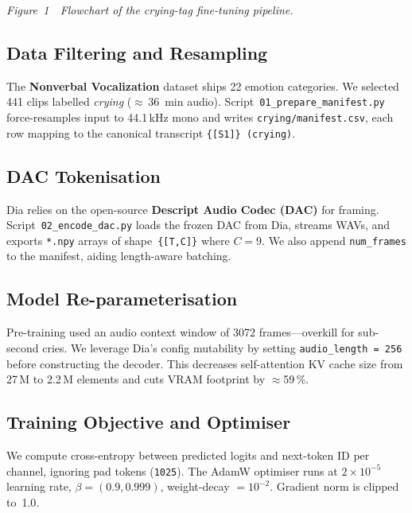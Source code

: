 \documentclass{article}
\begin{document}
\emph{Figure~1~~Flowchart of the crying-tag fine-tuning pipeline.}

\hypertarget{data-filtering-and-resampling}{%
\subsection{Data Filtering and
Resampling}\label{data-filtering-and-resampling}}

The \textbf{Nonverbal Vocalization} dataset ships 22 emotion categories.
We selected 441 clips labelled \emph{crying} ($\approx$\,36~min audio).
Script~\texttt{01\_prepare\_manifest.py} force-resamples input to
44.1\,kHz mono and writes \texttt{crying/manifest.csv}, each row mapping
to the canonical transcript \texttt{\{[S1]\}\,(crying)}.

\hypertarget{dac-tokenisation}{%
\subsection{DAC Tokenisation}\label{dac-tokenisation}}

Dia relies on the open-source \textbf{Descript Audio Codec (DAC)} for
framing. Script~\texttt{02\_encode\_dac.py} loads the frozen DAC from
Dia, streams WAVs, and exports \texttt{*.npy} arrays of
shape~\texttt{\{[T,C]\}} where \emph{$C=9$}. We also append
\texttt{num\_frames} to the manifest, aiding length-aware batching.

\hypertarget{model-reparameterisation}{%
\subsection{Model
Re-parameterisation}\label{model-reparameterisation}}

Pre-training used an audio context window of 3072 frames---overkill for
sub-second cries. We leverage Dia's config mutability by setting
\texttt{audio\_length = 256} before constructing the decoder. This
decreases self-attention KV cache size from 27\,M to 2.2\,M elements and
cuts VRAM footprint by $\approx$59\,\%.

\hypertarget{training-objective-and-optimiser}{%
\subsection{Training Objective and
Optimiser}\label{training-objective-and-optimiser}}

We compute cross-entropy between predicted logits and next-token ID per
channel, ignoring pad tokens (\texttt{1025}). The AdamW optimiser runs
at \textbf{$2 \times 10^{-5}$} learning rate, $\beta = (0.9, 0.999)$,
weight-decay $= 10^{-2}$. Gradient norm is clipped to~1.0.
\end{document}
